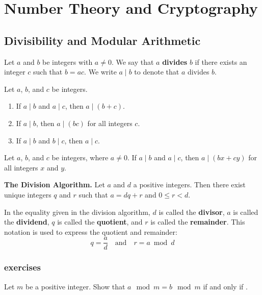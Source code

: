 \chapter{Number Theory and Cryptography}

\section{Divisibility and Modular Arithmetic}

\begin{definition}
  Let $a$ and $b$ be integers with $a \neq 0$. We say that $a$ \textbf{divides} $b$ if there exists an integer $c$ such that $b = ac$. We write $a \mid b$ to denote that $a$ divides $b$.
\end{definition}

\begin{theorem}
    Let $a$, $b$, and $c$ be integers. 
    \begin{enumerate}
        \item If $a \mid b$ and $a \mid c$, then $a \mid (b + c)$.
        \item If $a \mid b$, then $a \mid (bc)$ for all integers $c$.
        \item If $a \mid b$ and $b \mid c$, then $a \mid c$.
    \end{enumerate}
\end{theorem}

\begin{corollary}
    Let $a$, $b$, and $c$ be integers, where $a \neq 0$. If $a \mid b$ and $a \mid c$, then $a \mid (bx + cy)$ for all integers $x$ and $y$.
\end{corollary}

\begin{definition}
    \textbf{The Division Algorithm.} Let $a$ and $d$ a positive integers. Then there exist unique integers $q$ and $r$ such that $a = dq + r$ and $0 \leq r < d$.
\end{definition}

\begin{definition}
    In the equality given in the division algorithm, $d$ is called the \textbf{divisor}, $a$ is called the \textbf{dividend}, $q$ is called the \textbf{quotient}, and $r$ is called the \textbf{remainder}. This notation is used to express the quotient and remainder: 
    \begin{equation*}
        q = \frac{a}{d} \quad \text{and} \quad r = a \bmod d
    \end{equation*}
\end{definition}


\subsection{exercises}

\begin{exercise}[22]
    Let $m$ be a positive integer. Show that $a \mod m = b \mod m$ if and only if .
\end{exercise}
